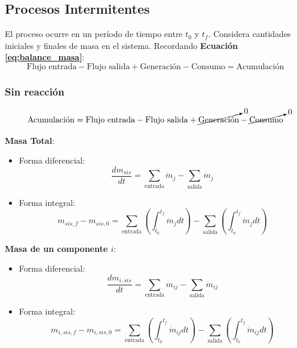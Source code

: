     \subsection{Procesos Intermitentes}
    
    El proceso ocurre en un período de tiempo entre \(t_{0}\) y \(t_{f}\). Considera cantidades iniciales y finales de masa en el sistema. Recordando \textbf{Ecuación \ref{eq:balance_masa}}:
    \[\text{Flujo entrada} - \text{Flujo salida} + \text{Generación} - \text{Consumo} = \text{Acumulación}\]
    
        \subsubsection{Sin reacción}
        \[\text{Acumulación} = \text{Flujo entrada} - \text{Flujo salida} + \cancelto{0}{\text{Generación}} - \cancelto{0}{\text{Consumo}}\]
        
        \textbf{Masa Total}:
        
        \begin{itemize}
            \item Forma diferencial:
            \begin{equation}
            \label{eq:proc_int_sin_tot_dif}
                \frac{dm_{sis}}{dt} = \sum_{\text{entrada}}\dot{m}_{j} - \sum_{\text{salida}}\dot{m}_{j}
            \end{equation}
            \item Forma integral:
            \begin{equation}
            \label{eq:proc_int_sin_tot_int}
                m_{sis, f} - m_{sis, 0} = \sum_{\text{entrada}}\left ( \int_{t_{0}}^{t_{f}}\dot{m}_{j}dt \right ) - \sum_{\text{salida}}\left ( \int_{t_{0}}^{t_{f}}\dot{m}_{j}dt \right )
            \end{equation}
        \end{itemize}
        
        \textbf{Masa de un componente \(i\)}:
        
        \begin{itemize}
            \item Forma diferencial:
            \begin{equation}
            \label{eq:proc_int_sin_i_dif}
                \frac{dm_{i, sis}}{dt} = \sum_{\text{entrada}}\dot{m}_{ij} - \sum_{\text{salida}}\dot{m}_{ij}
            \end{equation}
            \item Forma integral:
            \begin{equation}
            \label{eq:proc_int_sin_i_int}
                m_{i, sis, f} - m_{i, sis, 0} = \sum_{\text{entrada}}\left ( \int_{t_{0}}^{t_{f}}\dot{m}_{ij}dt \right ) - \sum_{\text{salida}}\left ( \int_{t_{0}}^{t_{f}}\dot{m}_{ij}dt \right )
            \end{equation}
        \end{itemize}
    
